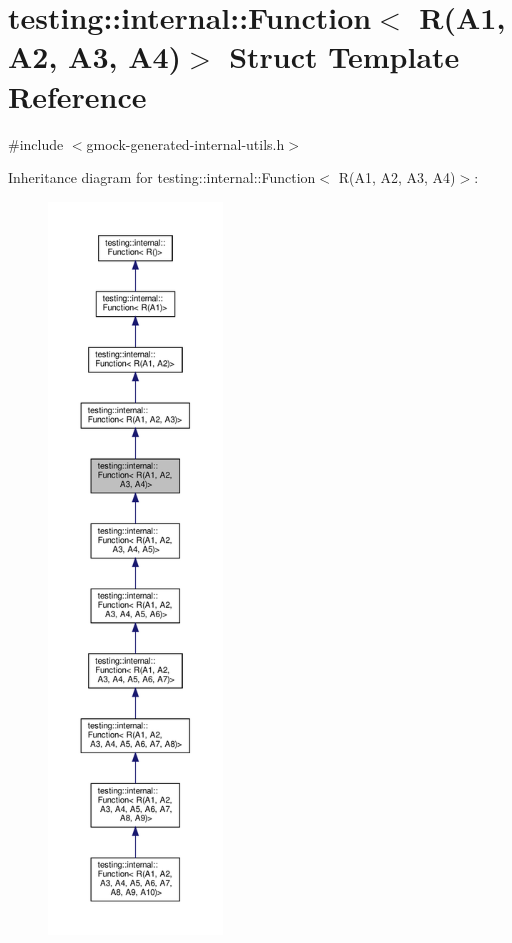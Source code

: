 \hypertarget{structtesting_1_1internal_1_1_function_3_01_r_07_a1_00_01_a2_00_01_a3_00_01_a4_08_4}{}\section{testing\+:\+:internal\+:\+:Function$<$ R(A1, A2, A3, A4)$>$ Struct Template Reference}
\label{structtesting_1_1internal_1_1_function_3_01_r_07_a1_00_01_a2_00_01_a3_00_01_a4_08_4}


{\ttfamily \#include $<$gmock-\/generated-\/internal-\/utils.\+h$>$}



Inheritance diagram for testing\+:\+:internal\+:\+:Function$<$ R(A1, A2, A3, A4)$>$\+:
\nopagebreak
\begin{figure}[H]
\begin{center}
\leavevmode
\includegraphics[height=550pt]{structtesting_1_1internal_1_1_function_3_01_r_07_a1_00_01_a2_00_01_a3_00_01_a4_08_4__inherit__graph}
\end{center}
\end{figure}


